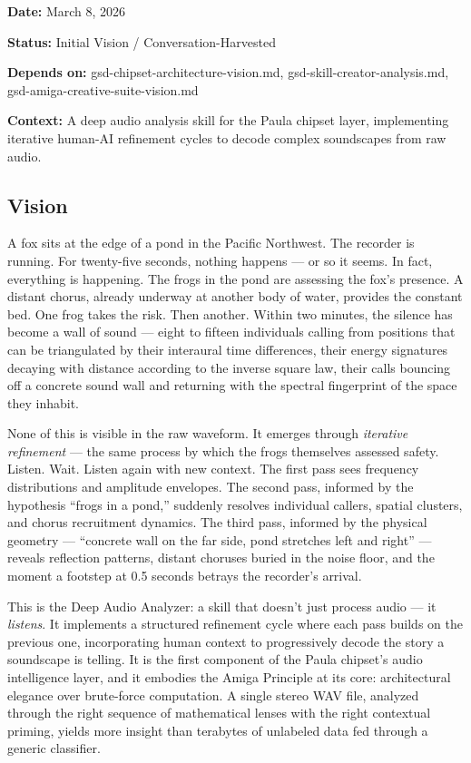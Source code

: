 \documentclass[11pt,letterpaper]{article}
\newcommand{\metafield}[2]{\textbf{\sffamily #1} #2\par}
\begin{document}
\metafield{Date:}{March 8, 2026}
\metafield{Status:}{Initial Vision / Conversation-Harvested}
\metafield{Depends on:}{gsd-chipset-architecture-vision.md, gsd-skill-creator-analysis.md, gsd-amiga-creative-suite-vision.md}
\metafield{Context:}{A deep audio analysis skill for the Paula chipset layer, implementing iterative human-AI refinement cycles to decode complex soundscapes from raw audio.}

\subsection{Vision}

A fox sits at the edge of a pond in the Pacific Northwest. The recorder is running. For twenty-five seconds, nothing happens --- or so it seems. In fact, everything is happening. The frogs in the pond are assessing the fox's presence. A distant chorus, already underway at another body of water, provides the constant bed. One frog takes the risk. Then another. Within two minutes, the silence has become a wall of sound --- eight to fifteen individuals calling from positions that can be triangulated by their interaural time differences, their energy signatures decaying with distance according to the inverse square law, their calls bouncing off a concrete sound wall and returning with the spectral fingerprint of the space they inhabit.

None of this is visible in the raw waveform. It emerges through \textit{iterative refinement} --- the same process by which the frogs themselves assessed safety. Listen. Wait. Listen again with new context. The first pass sees frequency distributions and amplitude envelopes. The second pass, informed by the hypothesis ``frogs in a pond,'' suddenly resolves individual callers, spatial clusters, and chorus recruitment dynamics. The third pass, informed by the physical geometry --- ``concrete wall on the far side, pond stretches left and right'' --- reveals reflection patterns, distant choruses buried in the noise floor, and the moment a footstep at 0.5 seconds betrays the recorder's arrival.

This is the Deep Audio Analyzer: a skill that doesn't just process audio --- it \textit{listens}. It implements a structured refinement cycle where each pass builds on the previous one, incorporating human context to progressively decode the story a soundscape is telling. It is the first component of the Paula chipset's audio intelligence layer, and it embodies the Amiga Principle at its core: architectural elegance over brute-force computation. A single stereo WAV file, analyzed through the right sequence of mathematical lenses with the right contextual priming, yields more insight than terabytes of unlabeled data fed through a generic classifier.
\end{document}
